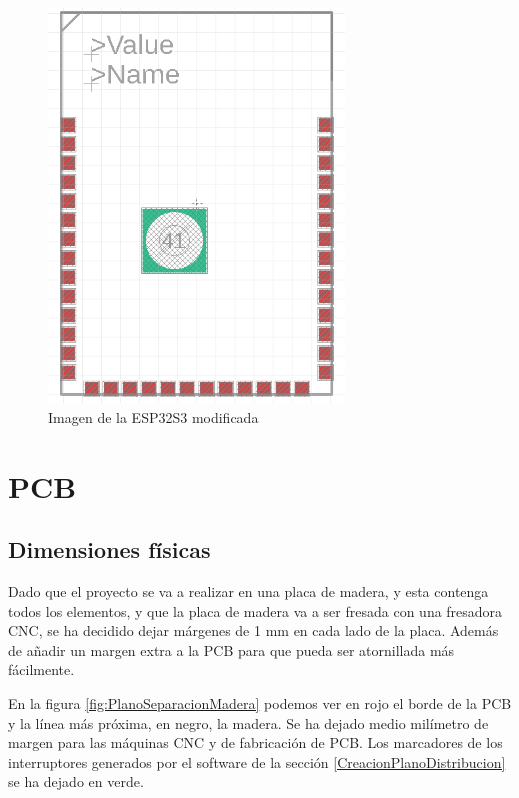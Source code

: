 \begin{figure}[H]
    \centering
    \includegraphics[width=0.7\textwidth]{imagenes/Capitulos/Cap13/ESP32S3HOLE.png}
    \caption{Imagen de la ESP32S3 modificada}
\end{figure}\label{fig:ESP32S3HOLE}

\section{PCB}\label{ApendicePCB}

\subsection{Dimensiones físicas}
Dado que el proyecto se va a realizar en una placa de madera, y esta contenga todos los elementos, y que la placa de madera va a ser fresada con una fresadora CNC, se ha decidido dejar márgenes de 1 mm en cada lado de la placa. Además de añadir un margen extra a la \gls{PCB} para que pueda ser atornillada más fácilmente.

En la figura \ref{fig:PlanoSeparacionMadera} podemos ver en rojo el borde de la \gls{PCB} y la línea más próxima, en negro, la madera. Se ha dejado medio milímetro de margen para las máquinas \gls{CNC} y de fabricación de \gls{PCB}. Los marcadores de los interruptores generados por el software de la sección \ref{CreacionPlanoDistribucion} se ha dejado en verde.

